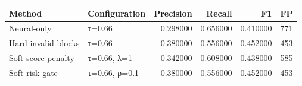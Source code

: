 \begin{tabular}{llrrrr}
\toprule
Method & Configuration & Precision & Recall & F1 & FP \\
\midrule
Neural-only & τ=0.66 & 0.298000 & 0.656000 & 0.410000 & 771 \\
Hard invalid-blocks & τ=0.66 & 0.380000 & 0.556000 & 0.452000 & 453 \\
Soft score penalty & τ=0.66, λ=1 & 0.342000 & 0.608000 & 0.438000 & 585 \\
Soft risk gate & τ=0.66, ρ=0.1 & 0.380000 & 0.556000 & 0.452000 & 453 \\
\bottomrule
\end{tabular}
